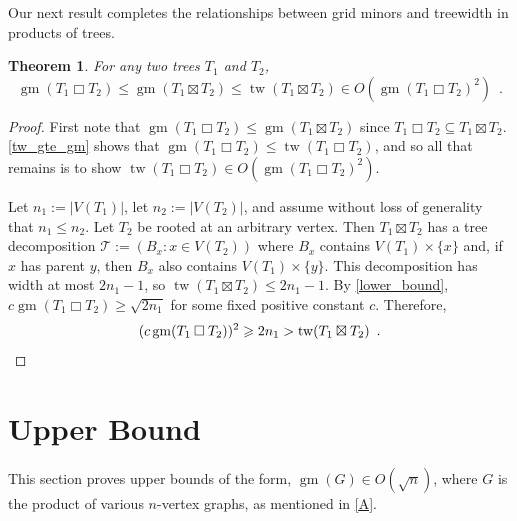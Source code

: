 \documentclass{patmorin}
\newcommand{\boxprod}{\mathbin{\Box}}
\renewcommand{\ge}{\geqslant}
\renewcommand{\le}{\leqslant}
\renewcommand{\leq}{\leqslant}
\DeclareMathOperator{\tw}{tw}
\DeclareMathOperator{\gm}{gm}
\theoremstyle{plain}
\newtheorem{thm}{Theorem}
\theoremstyle{definition}
\begin{document}
Our next result completes the relationships between grid minors and treewidth in products of trees.  

\begin{thm}\label{quadratic_grid_minor}
    For any two trees $T_1$ and $T_2$, 
    \[
\gm(T_1\boxprod T_2) \leq
\gm(T_1\boxtimes T_2) \leq \tw(T_1\boxtimes T_2) \in O(\gm(T_1\boxprod T_2)^2)
 \enspace .
\]
\end{thm}


\begin{proof}
    First note that $\gm(T_1 \boxprod T_2) \le \gm(T_1 \boxtimes T_2)$ since  
    $T_1 \boxprod T_2 \subseteq T_1 \boxtimes T_2$. \eqref{tw_gte_gm} shows that $\gm(T_1 \boxprod T_2) \le \tw(T_1\boxprod T_2)$, and so all that remains is to show $\tw(T_1\boxprod T_2) \in O(\gm(T_1 \boxprod T_2)^2)$.
    
    Let $n_1:=|V(T_1)|$, let $n_2:=|V(T_2)|$, and assume without loss of generality that $n_1\le n_2$.  Let $T_2$ be rooted at an arbitrary vertex.  Then $T_1\boxtimes T_2$ has a tree decomposition $\mathcal{T}:=(B_x:x\in V(T_2))$ where $B_x$ contains $V(T_1)\times\{x\}$ and, if $x$ has parent $y$, then $B_x$ also contains $V(T_1)\times\{y\}$.  This decomposition has width at most $2n_1-1$, so $\tw(T_1\boxtimes T_2)\le 2n_1-1$.  By \cref{lower_bound}, $c\gm(T_1\boxprod T_2) \ge \sqrt{2n_1}$ for some fixed positive constant $c$. 
    Therefore, 
    \[
       (c\gm(T_1\boxprod T_2))^2 \ge 2n_1 > \tw(T_1\boxtimes T_2) \enspace . \qedhere
    \]
\end{proof}



\section{Upper Bound}\label{C}


This section proves upper bounds of the form, $\gm(G)\in O(\sqrt{n})$, where $G$ is the product of various $n$-vertex graphs, as mentioned in \cref{A}.

\end{document}
